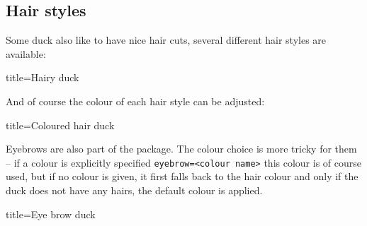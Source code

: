 \documentclass[parskip=half]{scrartcl}
\begin{document}
\clearpage
\subsection{Hair styles}

Some duck also like to have nice hair cuts, several different hair styles are available:

\begin{tcblisting}{title={Hairy duck}}
\begin{tikzpicture}
	\duck[longhair]
\end{tikzpicture}
\begin{tikzpicture}
	\duck[shorthair]
\end{tikzpicture}

\begin{tikzpicture}
	\duck[crazyhair]
\end{tikzpicture}
\begin{tikzpicture}
	\duck[recedinghair]
\end{tikzpicture}
\end{tcblisting}

And of course the colour of each hair style can be adjusted:
\begin{tcblisting}{title={Coloured hair duck}}
\begin{tikzpicture}
	\duck[longhair=teal]
\end{tikzpicture}
\end{tcblisting}

Eyebrows are also part of the package. The colour choice is more tricky for them -- if a colour is explicitly specified \lstinline|eyebrow=<colour name>| this colour is of course used, but if no colour is given, it first falls back to the hair colour and only if the duck does not have any hairs, the default colour is applied.

\begin{tcblisting}{title={Eye brow duck}}
\begin{tikzpicture}
	\duck[eyebrow]
\end{tikzpicture}
\begin{tikzpicture}
	\duck[longhair=blue, 
		eyebrow]
\end{tikzpicture}

\begin{tikzpicture}
	\duck[crazyhair=red, 
		eyebrow=blue]
\end{tikzpicture}
\end{tcblisting}
\end{document}
